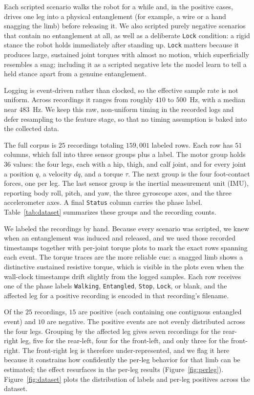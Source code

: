 \documentclass[conference]{IEEEtran}
\begin{document}
Each scripted scenario walks the robot for a while and, in the positive cases, drives one leg into a physical entanglement (for example, a wire or a hand snagging the limb) before releasing it. We also scripted purely negative scenarios that contain no entanglement at all, as well as a deliberate \texttt{Lock} condition: a rigid stance the robot holds immediately after standing up. \texttt{Lock} matters because it produces large, sustained joint torques with almost no motion, which superficially resembles a snag; including it as a scripted negative lets the model learn to tell a held stance apart from a genuine entanglement.

Logging is event-driven rather than clocked, so the effective sample rate is not uniform. Across recordings it ranges from roughly $410$ to $500$~Hz, with a median near $483$~Hz. We keep this raw, non-uniform timing in the recorded logs and defer resampling to the feature stage, so that no timing assumption is baked into the collected data.

The full corpus is $25$ recordings totaling $159{,}001$ labeled rows. Each row has $51$ columns, which fall into three sensor groups plus a label. The motor group holds $36$ values: the four legs, each with a hip, thigh, and calf joint, and for every joint a position $q$, a velocity $dq$, and a torque $\tau$. The next group is the four foot-contact forces, one per leg. The last sensor group is the inertial measurement unit (IMU), reporting body roll, pitch, and yaw, the three gyroscope axes, and the three accelerometer axes. A final \texttt{Status} column carries the phase label. Table~\ref{tab:dataset} summarizes these groups and the recording counts.

We labeled the recordings by hand. Because every scenario was scripted, we knew when an entanglement was induced and released, and we used those recorded timestamps together with per-joint torque plots to mark the exact rows spanning each event. The torque traces are the more reliable cue: a snagged limb shows a distinctive sustained resistive torque, which is visible in the plots even when the wall-clock timestamps drift slightly from the logged samples. Each row receives one of the phase labels \texttt{Walking}, \texttt{Entangled}, \texttt{Stop}, \texttt{Lock}, or blank, and the affected leg for a positive recording is encoded in that recording's filename.

Of the $25$ recordings, $15$ are positive (each containing one contiguous entangled event) and $10$ are negative. The positive events are not evenly distributed across the four legs. Grouping by the affected leg gives seven recordings for the rear-right leg, five for the rear-left, four for the front-left, and only three for the front-right. The front-right leg is therefore under-represented, and we flag it here because it constrains how confidently the per-leg behavior for that limb can be estimated; the effect resurfaces in the per-leg results (Figure~\ref{fig:perleg}). Figure~\ref{fig:dataset} plots the distribution of labels and per-leg positives across the dataset.
\end{document}
